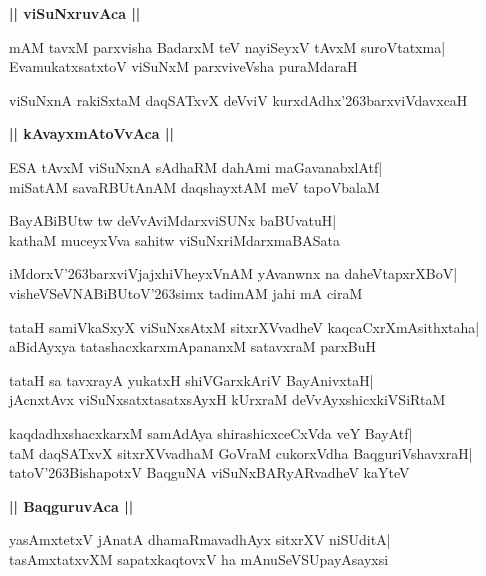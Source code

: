\documentclass[twoside,12pt,openright]{book}
\def\S{\char'263}
\newcounter{shloka}[chapter]
\def\uvaca#1{\centerline{{\large\textbf{#1}}}}
\begin{document}
\uvaca{|| viSuNxruvAca ||}
\begin{shloka}%
mAM tavxM parxvisha BadarxM teV nayiSeyxV tAvxM suroVtatxma|\\
EvamukatxsatxtoV viSuNxM parxviveVsha puraMdaraH
\end{shloka}

\begin{shloka}%
viSuNxnA rakiSxtaM daqSATxvX deVviV kurxdAdhx\S barxviVdavxcaH
\end{shloka}

\uvaca{|| kAvayxmAtoVvAca ||}
\begin{shloka}%
ESA tAvxM viSuNxnA sAdhaRM dahAmi maGavanabxlAtf|\\
miSatAM savaRBUtAnAM daqshayxtAM meV tapoVbalaM
\end{shloka}

\begin{shloka}%
BayABiBUtw tw deVvAviMdarxviSUNx baBUvatuH|\\
kathaM muceyxVva sahitw viSuNxriMdarxmaBASata
\end{shloka}

\begin{shloka}%
iMdorxV\S barxviVjajxhiVheyxVnAM yAvanwnx na daheVtapxrXBoV|\\
visheVSeVNABiBUtoV\S simx tadimAM jahi mA ciraM 
\end{shloka}

\begin{shloka}%
tataH samiVkaSxyX viSuNxsAtxM sitxrXVvadheV kaqcaCxrXmAsithxtaha|\\
aBidAyxya tatashacxkarxmApananxM satavxraM parxBuH
\end{shloka}

\begin{shloka}%
tataH sa tavxrayA yukatxH shiVGarxkAriV BayAnivxtaH|\\
jAcnxtAvx viSuNxsatxtasatxsAyxH kUrxraM deVvAyxshicxkiVSiRtaM 
\end{shloka}

\begin{shloka}%
kaqdadhxshacxkarxM samAdAya shirashicxceCxVda veY BayAtf|\\
taM daqSATxvX sitxrXVvadhaM GoVraM cukorxVdha BaqguriVshavxraH|\\
tatoV\S BishapotxV BaqguNA viSuNxBARyARvadheV kaYteV
\end{shloka}

\uvaca{|| BaqguruvAca ||}
\begin{shloka}%
yasAmxtetxV jAnatA dhamaRmavadhAyx sitxrXV niSUditA|\\
tasAmxtatxvXM sapatxkaqtovxV ha mAnuSeVSUpayAsayxsi
\end{shloka}
\end{document}
